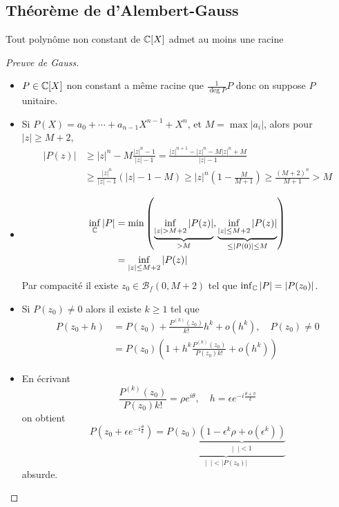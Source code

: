 \subsection{Théorème de d'Alembert-Gauss}

\begin{thm} 
    Tout polynôme non constant de $\mathbb C[X]$ admet au moins une racine
\end{thm}

\begin{proof}[Preuve de Gauss]
    \begin{itemize}
        \item $P\in \mathbb C[X]$ non constant a même racine que $\frac1{\deg P}P$ donc on suppose $P$ unitaire.
        \item Si $P(X)=a_0+\cdots+ a_{n-1}X^{n-1}+X^n$, et $M=\max |a_i|$, alors pour $|z|\geq M+2$, \begin{align*}
                |P(z)|&\geq |z|^n-M\frac{|z|^n-1}{|z|-1}=\frac{|z|^{n+1}-|z|^n-M|z|^n+M}{|z|-1}\\
                      &\geq \frac{|z|^n}{|z|-1} \left( |z|-1-M \right)\geq |z|^n\left(1-\frac M{M+1}\right)\geq \frac{(M+2)^n}{M+1}>M
            \end{align*}
        \item \begin{align*}
                \inf_{\C}|P|&=\min\left(\underbrace{\inf_{|z|>M+2}|P(z)|}_{>M}, \underbrace{\inf_{|z|\leq M+2}|P(z)|}_{\leq |P(0)|\leq M}\right) \\&=\inf _{|z|\leq M+2}|P(z)|
            \end{align*}
            Par compacité il existe $z_0\in\mathcal B_f(0, M+2)$ tel que $\inf_{\mathbb C}|P|=|P(z_0)|$.
        \item Si $P(z_0)\neq 0$ alors il existe $k\geq 1$ tel que \begin{align*}
                P(z_0+h)&=P(z_0)+\frac{P^{(k)}(z_0)}{k!}h^k+o(h^k), \quad P(z_0)\neq 0 \\
                        &=P(z_0)\left(1+h^k\frac{P^{(k)}(z_0)}{P(z_0)k!}+o(h^k) \right)
            \end{align*}
        \item En écrivant \[
                \frac{P^{(k)}(z_0)}{P(z_0)k!}=\rho e^{i\theta}, \quad h=\epsilon e^{-i\frac{\theta+\pi}k}
            \]
            on obtient \[
                P(z_0+\epsilon e^{-i\frac\theta k})=\underbrace{P(z_0)\underbrace{\left(1 - \epsilon^k \rho + o(\epsilon^k)\right)}_{|\;\;|<1}}_{|\;\;|<|P(z_0)|}
            \]
            absurde.
    \end{itemize}
\end{proof}

